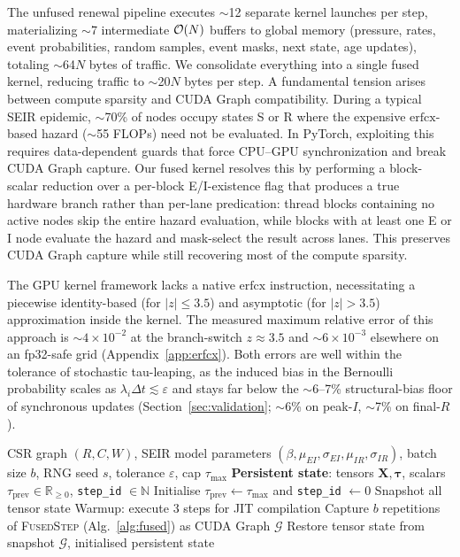 The unfused renewal pipeline executes $\sim$12 separate kernel launches per step, materializing $\sim$7 intermediate $\mathcal{O}(N)$ buffers to global memory (pressure, rates, event probabilities, random samples, event masks, next state, age updates), totaling $\sim$64$N$ bytes of traffic. We consolidate everything into a single fused kernel, reducing traffic to $\sim$20$N$ bytes per step.
A fundamental tension arises between compute sparsity and CUDA Graph compatibility. During a typical SEIR epidemic, $\sim$70\% of nodes occupy states S or R where the expensive $\mathrm{erfcx}$-based hazard ($\sim$55 FLOPs) need not be evaluated. In PyTorch, exploiting this requires data-dependent guards that force CPU--GPU synchronization and break CUDA Graph capture. Our fused kernel resolves this by performing a block-scalar reduction over a per-block E/I-existence flag that produces a true hardware branch rather than per-lane predication: thread blocks containing no active nodes skip the entire hazard evaluation, while blocks with at least one E or I node evaluate the hazard and mask-select the result across lanes. This preserves CUDA Graph capture while still recovering most of the compute sparsity. 

The GPU kernel framework lacks a native $\mathrm{erfcx}$ instruction, necessitating a piecewise identity-based (for $|z| \leq 3.5$) and asymptotic (for $|z| > 3.5$) approximation inside the kernel. The measured maximum relative error of this approach is $\sim$$4 \times 10^{-2}$ at the branch-switch $z \approx 3.5$ and $\sim$$6 \times 10^{-3}$ elsewhere on an fp32-safe grid (Appendix~\ref{app:erfcx}). Both errors are well within the tolerance of stochastic tau-leaping, as the induced bias in the Bernoulli probability scales as $\lambda_i \Delta t \lesssim \varepsilon$ and stays far below the $\sim$6--7\% structural-bias floor of synchronous updates (Section~\ref{sec:validation}; $\sim$6\% on peak-$I$, $\sim$7\% on final-$R$).

\begin{algorithm}[H]
\caption{Fused Renewal Engine with CUDA Graph: Capture}
\label{alg:fused_capture}
\begin{algorithmic}[1]
\Require CSR graph $(R, C, W)$, SEIR model parameters $(\beta, \mu_{EI}, \sigma_{EI}, \mu_{IR}, \sigma_{IR})$, batch size $b$, RNG seed $s$, tolerance $\varepsilon$, cap $\tau_{\max}$
\State \textbf{Persistent state}: tensors $\mathbf{X}, \bm{\tau}$, scalars $\tau_{\mathrm{prev}} \in \mathbb{R}_{\geq 0}$, \texttt{step\_id} $\in \mathbb{N}$
\State Initialise $\tau_{\mathrm{prev}} \gets \tau_{\max}$ and \texttt{step\_id} $\gets 0$
\State Snapshot all tensor state
\State Warmup: execute 3 steps for JIT compilation
\State Capture $b$ repetitions of \textsc{FusedStep} (Alg.~\ref{alg:fused}) as CUDA Graph $\mathcal{G}$
\State Restore tensor state from snapshot
\State \Return $\mathcal{G}$, initialised persistent state
\end{algorithmic}
\end{algorithm}

